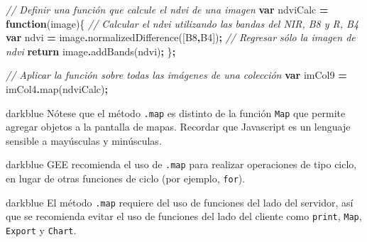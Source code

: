 \documentclass[
  12pt,
  letterpaper,
  twoside]{book}
\newenvironment{Shaded}{\begin{snugshade}}{\end{snugshade}}
\newcommand{\CommentTok}[1]{\textcolor[rgb]{0.56,0.35,0.01}{\textit{#1}}}
\newcommand{\ControlFlowTok}[1]{\textcolor[rgb]{0.13,0.29,0.53}{\textbf{#1}}}
\newcommand{\FunctionTok}[1]{\textcolor[rgb]{0.00,0.00,0.00}{#1}}
\newcommand{\KeywordTok}[1]{\textcolor[rgb]{0.13,0.29,0.53}{\textbf{#1}}}
\newcommand{\NormalTok}[1]{#1}
\newcommand{\OperatorTok}[1]{\textcolor[rgb]{0.81,0.36,0.00}{\textbf{#1}}}
\newcommand{\StringTok}[1]{\textcolor[rgb]{0.31,0.60,0.02}{#1}}
\begin{document}
\begin{Shaded}
\begin{Highlighting}[]
\CommentTok{// Definir una función que calcule el ndvi de una imagen}
\KeywordTok{var}\NormalTok{ ndviCalc }\OperatorTok{=} \KeywordTok{function}\NormalTok{(image)\{}
  \CommentTok{// Calcular el ndvi utilizando las bandas del NIR, B8 y R, B4}
  \KeywordTok{var}\NormalTok{ ndvi }\OperatorTok{=}\NormalTok{ image}\OperatorTok{.}\FunctionTok{normalizedDifference}\NormalTok{([}\StringTok{\textquotesingle{}B8\textquotesingle{}}\OperatorTok{,}\StringTok{\textquotesingle{}B4\textquotesingle{}}\NormalTok{])}\OperatorTok{;}
  \CommentTok{// Regresar sólo la imagen de ndvi}
  \ControlFlowTok{return}\NormalTok{ image}\OperatorTok{.}\FunctionTok{addBands}\NormalTok{(ndvi)}\OperatorTok{;}
\NormalTok{\}}\OperatorTok{;}

\CommentTok{// Aplicar la función sobre todas las imágenes de una colección}
\KeywordTok{var}\NormalTok{ imCol9 }\OperatorTok{=}\NormalTok{ imCol4}\OperatorTok{.}\FunctionTok{map}\NormalTok{(ndviCalc)}\OperatorTok{;}
\end{Highlighting}
\end{Shaded}

\begin{bluebox2}

\begin{awesomeblock}{5pt}{\faLightbulb}{darkblue}
Nótese que el método \texttt{.map} es distinto de la función \texttt{Map} que permite agregar objetos a la pantalla de mapas. Recordar que Javascript es un lenguaje sensible a mayúsculas y minúsculas.

\end{awesomeblock}

\end{bluebox2}

\begin{bluebox2}

\begin{awesomeblock}{5pt}{\faLightbulb}{darkblue}
GEE recomienda el uso de \texttt{.map} para realizar operaciones de tipo ciclo, en lugar de otras funciones de ciclo (por ejemplo, \texttt{for}).

\end{awesomeblock}

\end{bluebox2}

\begin{bluebox2}

\begin{awesomeblock}{5pt}{\faLightbulb}{darkblue}
El método \texttt{.map} requiere del uso de funciones del lado del servidor, así que se recomienda evitar el uso de funciones del lado del cliente como \texttt{print}, \texttt{Map}, \texttt{Export} y \texttt{Chart}.

\end{awesomeblock}

\end{bluebox2}
\end{document}
